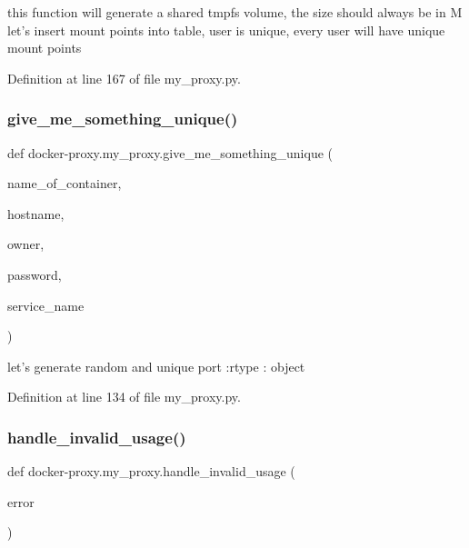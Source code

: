 \begin{DoxyVerb}this function will generate a shared tmpfs volume, the size should always be in M
let's insert mount points into table, user is unique, every user will have unique mount points
\end{DoxyVerb}
 

Definition at line 167 of file my\+\_\+proxy.\+py.

\hypertarget{namespacedocker-proxy_1_1my__proxy_a0bf8985afda99ee825115bd5df0b6b40}{}\label{namespacedocker-proxy_1_1my__proxy_a0bf8985afda99ee825115bd5df0b6b40} 
\subsubsection{\texorpdfstring{give\+\_\+me\+\_\+something\+\_\+unique()}{give\_me\_something\_unique()}}
{\footnotesize\ttfamily def docker-\/proxy.\+my\+\_\+proxy.\+give\+\_\+me\+\_\+something\+\_\+unique (\begin{DoxyParamCaption}\item[{}]{name\+\_\+of\+\_\+container,  }\item[{}]{hostname,  }\item[{}]{owner,  }\item[{}]{password,  }\item[{}]{service\+\_\+name }\end{DoxyParamCaption})}

\begin{DoxyVerb}let's generate random and unique port
:rtype : object
\end{DoxyVerb}
 

Definition at line 134 of file my\+\_\+proxy.\+py.

\hypertarget{namespacedocker-proxy_1_1my__proxy_a0c927506d8346f17b620ac8e131174d0}{}\label{namespacedocker-proxy_1_1my__proxy_a0c927506d8346f17b620ac8e131174d0} 
\subsubsection{\texorpdfstring{handle\+\_\+invalid\+\_\+usage()}{handle\_invalid\_usage()}}
{\footnotesize\ttfamily def docker-\/proxy.\+my\+\_\+proxy.\+handle\+\_\+invalid\+\_\+usage (\begin{DoxyParamCaption}\item[{}]{error }\end{DoxyParamCaption})}



